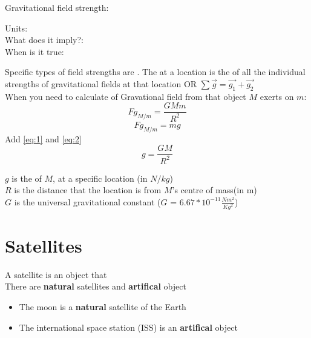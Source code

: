 Gravitational field strength:
\begin{center}
    Units: \\
    What does it imply?:  \\
    When is it true: 
\end{center}

Specific types of field strengths are . The  at a location is the 
of all the individual strengths of gravitational fields at that location OR $\sum \vec{g} = \vec{g_{1}} + \vec{g_{2}}$\\

When you need to calculate  of Gravational field from that object $M$ exerts on $m$:
\begin{equation} \label{eq:1}
    Fg_{M/m} = \frac{GMm}{R^2}
\end{equation}
\begin{equation} \label{eq:2}
    Fg_{M/m} = mg
\end{equation}
Add \ref{eq:1} and \ref{eq:2}
\begin{equation}
    g = \frac{GM}{R^2}
\end{equation}
\begin{center}
    $g$ is the  of $M$, at a specific location (in $N/kg$)\\
    $R$ is the distance that the location is from $M$'s centre of mass(in m)\\
    $G$ is the universal gravitational constant ($G$ = $6.67*10^{-11}\frac{Nm^2}{Kg^2}$)
\end{center}

\section{Satellites}
A satellite is an object that \\

There are \textbf{natural} satellites and \textbf{artifical} object
\begin{itemize}
    \item The moon is a \textbf{natural} satellite of the Earth
    \item The international space station (ISS) is an \textbf{artifical} object
\end{itemize}

